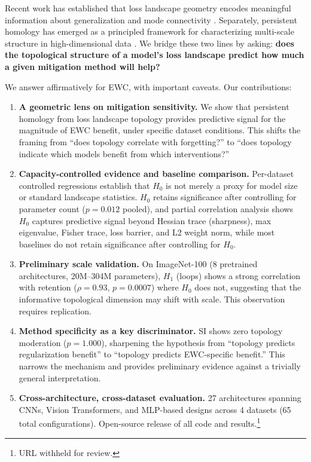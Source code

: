 \documentclass{article}
\begin{document}
Recent work has established that loss landscape geometry encodes meaningful information about generalization \citep{li2018visualizing, keskar2017on} and mode connectivity \citep{garipov2018loss}. Separately, persistent homology has emerged as a principled framework for characterizing multi-scale structure in high-dimensional data \citep{carlsson2009topology}. We bridge these two lines by asking: \textbf{does the topological structure of a model's loss landscape predict how much a given mitigation method will help?}

We answer affirmatively for EWC, with important caveats. Our contributions:

\begin{enumerate}[nosep,leftmargin=*]
    \item \textbf{A geometric lens on mitigation sensitivity.} We show that persistent homology from loss landscape topology provides predictive signal for the magnitude of EWC benefit, under specific dataset conditions. This shifts the framing from ``does topology correlate with forgetting?'' to ``does topology indicate which models benefit from which interventions?''

    \item \textbf{Capacity-controlled evidence and baseline comparison.} Per-dataset controlled regressions establish that $H_0$ is not merely a proxy for model size or standard landscape statistics. $H_0$ retains significance after controlling for parameter count ($p = 0.012$ pooled), and partial correlation analysis shows $H_0$ captures predictive signal beyond Hessian trace (sharpness), max eigenvalue, Fisher trace, loss barrier, and L2 weight norm, while most baselines do not retain significance after controlling for $H_0$.

    \item \textbf{Preliminary scale validation.} On ImageNet-100 (8 pretrained architectures, 20M--304M parameters), $H_1$ (loops) shows a strong correlation with retention ($\rho = 0.93$, $p = 0.0007$) where $H_0$ does not, suggesting that the informative topological dimension may shift with scale. This observation requires replication.

    \item \textbf{Method specificity as a key discriminator.} SI shows zero topology moderation ($p = 1.000$), sharpening the hypothesis from ``topology predicts regularization benefit'' to ``topology predicts EWC-specific benefit.'' This narrows the mechanism and provides preliminary evidence against a trivially general interpretation.

    \item \textbf{Cross-architecture, cross-dataset evaluation.} 27 architectures spanning CNNs, Vision Transformers, and MLP-based designs across 4 datasets (65 total configurations). Open-source release of all code and results.\footnote{URL withheld for review.}
\end{enumerate}
\end{document}
